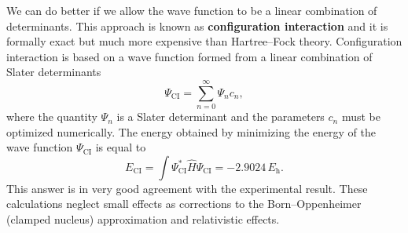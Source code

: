 \documentclass[../Main/chem331-notes.tex]{subfiles}
\begin{document}
We can do better if we allow the wave function to be a linear combination of determinants. This approach is known as \textbf{configuration interaction} and it is formally exact but much more expensive than Hartree--Fock theory. Configuration interaction is based on a wave function formed from a linear combination of Slater determinants
\begin{equation}
\Psi_\mathrm{CI} = \sum_{n=0}^\infty \Psi_n c_n,
\end{equation}
where the quantity $\Psi_n$ is a Slater determinant and the parameters $c_n$ must be optimized numerically.
The energy obtained by minimizing the energy of the wave function $\Psi_\mathrm{CI}$ is equal to
\begin{equation}
E_\mathrm{CI} = \int \Psi^*_\mathrm{CI} \hat{H} \Psi_\mathrm{CI} = -2.9024 \, E_\mathrm{h}.
\end{equation}
This answer is in very good agreement with the experimental result.
These calculations neglect small effects as corrections to the Born--Oppenheimer (clamped nucleus) approximation and relativistic effects.
\end{document}
